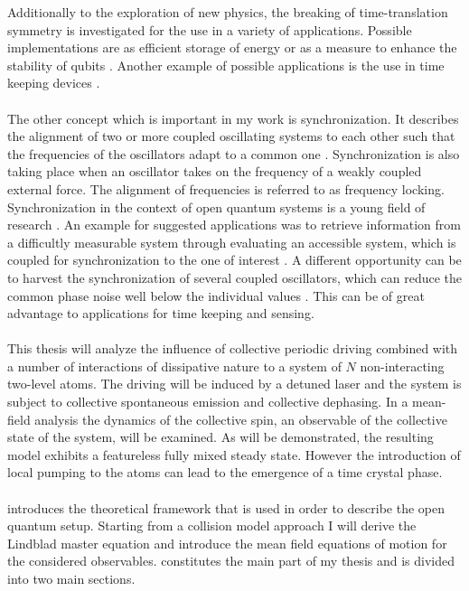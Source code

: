Additionally to the exploration of new physics, the breaking of time-translation symmetry is investigated for the use in a variety of applications. Possible implementations are as efficient storage of energy \cite{paulino_thermodynamics_2025} or as a measure to enhance the stability of qubits \cite{barnes_stabilization_2019,qiao_floquet-enhanced_2021}. Another example of possible applications is the use in time keeping devices \cite{taheri_all-optical_2022}.\\\\
The other concept which is important in my work is synchronization. It describes the alignment of two or more coupled oscillating systems to each other such that the frequencies of the oscillators adapt to a common one \cite{pikovskij_synchronization_2007}. Synchronization is also taking place when an oscillator takes on the frequency of a weakly coupled external force. The alignment of frequencies is referred to as frequency locking. Synchronization in the context of open quantum systems is a young field of research \cite{galve_quantum_2017}. An example for suggested applications was to retrieve information from a difficultly measurable system through evaluating an accessible system, which is coupled for synchronization to the one of interest \cite{giorgi_probing_2016}. A different opportunity can be to harvest the synchronization of several coupled oscillators, which can reduce the common phase noise well below the individual values \cite{zhang_synchronization_2015,matheny_phase_2014}. This can be of great advantage to applications for time keeping and sensing.\\\\
This thesis will analyze the influence of collective periodic driving combined with a number of interactions of dissipative nature to a system of $N$ non-interacting two-level atoms. The driving will be induced by a detuned laser and the system is subject to collective spontaneous emission and collective dephasing. %
In a mean-field analysis the dynamics of the collective spin, an observable of the collective state of the system, will be examined. As will be demonstrated, the resulting model exhibits a featureless fully mixed steady state. However the introduction of local pumping to the atoms can lead to the emergence of a time crystal phase.\\\\
 introduces the theoretical framework that is used in order to describe the open quantum setup. Starting from a collision model approach I will derive the Lindblad master equation and introduce the mean field equations of motion for the considered observables.  constitutes the main part of my thesis and is divided into two main sections. 

